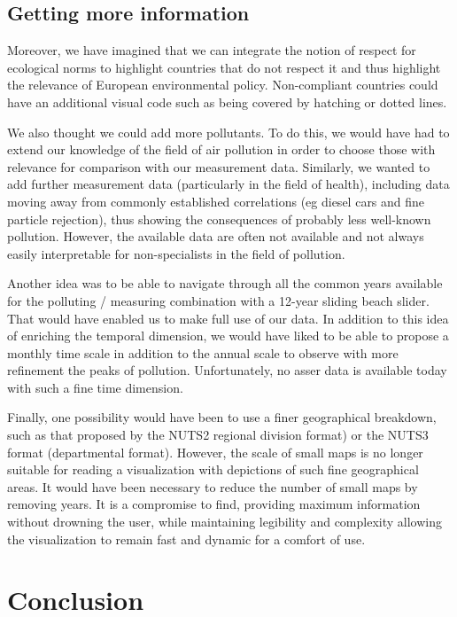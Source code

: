 \documentclass[preprint,journal]{vgtc}       %
\begin{document}
\subsection{Getting more information}
Moreover, we have imagined that we can integrate the notion of respect for ecological norms to highlight countries that do not respect it and thus highlight the relevance of European environmental policy. Non-compliant countries could have an additional visual code such as being covered by hatching or dotted lines.

We also thought we could add more pollutants. To do this, we would have had to extend our knowledge of the field of air pollution in order to choose those with relevance for comparison with our measurement data. Similarly, we wanted to add further measurement data (particularly in the field of health), including data moving away from commonly established correlations (eg diesel cars and fine particle rejection), thus showing the consequences of probably less well-known pollution. However, the available data are often not available and not always easily interpretable for non-specialists in the field of pollution.
		
Another idea was to be able to navigate through all the common years available for the polluting / measuring combination with a 12-year sliding beach slider. That would have enabled us to make full use of our data. In addition to this idea of ​​enriching the temporal dimension, we would have liked to be able to propose a monthly time scale in addition to the annual scale to observe with more refinement the peaks of pollution. Unfortunately, no asser data is available today with such a fine time dimension.

Finally, one possibility would have been to use a finer geographical breakdown, such as that proposed by the NUTS2 regional division format) or the NUTS3 format (departmental format). However, the scale of small maps is no longer suitable for reading a visualization with depictions of such fine geographical areas. It would have been necessary to reduce the number of small maps by removing years. It is a compromise to find, providing maximum information without drowning the user, while maintaining legibility and complexity allowing the visualization to remain fast and dynamic for a comfort of use.


\section{Conclusion}
\end{document}
